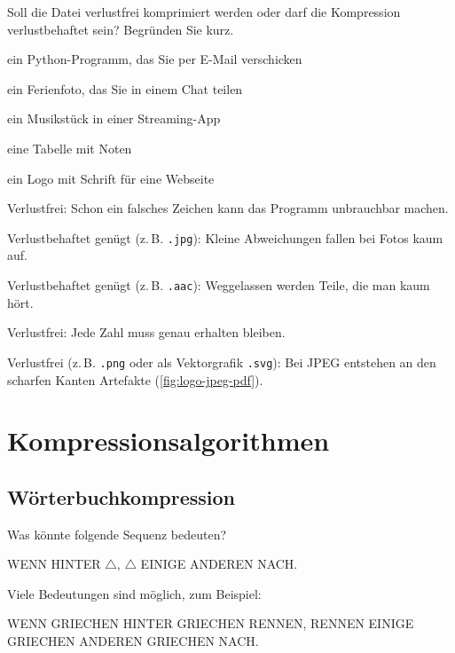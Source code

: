 \begin{myexercise}\label{ex:verlustfrei}
	Soll die Datei verlustfrei komprimiert werden oder darf die Kompression verlustbehaftet sein? Begründen Sie kurz.
	\begin{aenum}
		\item ein Python-Programm, das Sie per E-Mail verschicken
		\item ein Ferienfoto, das Sie in einem Chat teilen
		\item ein Musikstück in einer Streaming-App
		\item eine Tabelle mit Noten
		\item ein Logo mit Schrift für eine Webseite
	\end{aenum}
	\begin{myanswer}
		\begin{aenum}
			\item Verlustfrei: Schon ein falsches Zeichen kann das Programm unbrauchbar machen.
			\item Verlustbehaftet genügt (z.\,B. \texttt{.jpg}): Kleine Abweichungen fallen bei Fotos kaum auf.
			\item Verlustbehaftet genügt (z.\,B. \texttt{.aac}): Weggelassen werden Teile, die man kaum hört.
			\item Verlustfrei: Jede Zahl muss genau erhalten bleiben.
			\item Verlustfrei (z.\,B. \texttt{.png} oder als Vektorgrafik \texttt{.svg}): Bei JPEG entstehen an den scharfen Kanten Artefakte (\cref{fig:logo-jpeg-pdf}).
		\end{aenum}
	\end{myanswer}
\end{myexercise}

\section{Kompressionsalgorithmen}

\subsection{Wörterbuchkompression}

\begin{myexercise}\label{ex:griechen}
	Was könnte folgende Sequenz bedeuten?
	\begin{center}
		WENN  HINTER  $\triangle$, $\triangle$ EINIGE  ANDEREN  NACH.
	\end{center}
	\begin{myanswer}
		Viele Bedeutungen sind möglich, zum Beispiel:
		\begin{center}
			WENN GRIECHEN HINTER GRIECHEN RENNEN, RENNEN EINIGE GRIECHEN ANDEREN GRIECHEN NACH.
		\end{center}
	\end{myanswer}
\end{myexercise}

